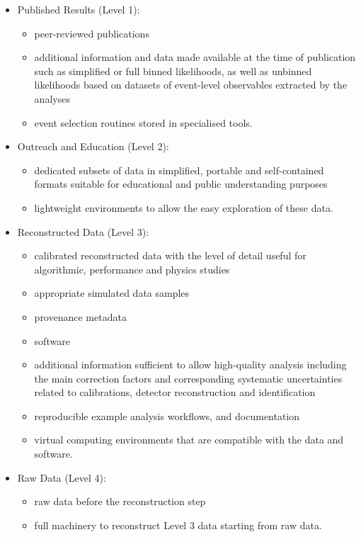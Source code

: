 \documentclass[11pt]{article}
\begin{document}
\begin{itemize}
\item Published Results (Level 1): 
\begin{itemize}
    \item peer-reviewed publications
    \item additional information and data made available at the time of publication such as simplified or full binned likelihoods, as well as unbinned likelihoods based on datasets of event-level observables extracted by the analyses
    \item event selection routines stored in specialised tools.
\end{itemize}
\item Outreach and Education (Level 2): 
\begin{itemize}
    \item dedicated subsets of data in simplified, portable and self-contained formats suitable for educational and public understanding purposes
    \item lightweight environments to allow the easy exploration of these data.
\end{itemize}
\item Reconstructed Data (Level 3): 
\begin{itemize}
    \item calibrated reconstructed data with the level of detail useful for algorithmic, performance and physics studies
    \item appropriate simulated data samples
    \item provenance metadata
    \item software 
    \item additional information sufficient to allow high-quality analysis including the main correction factors and corresponding systematic uncertainties related to calibrations, detector reconstruction and identification
    \item reproducible example analysis workflows, and documentation
    \item virtual computing environments that are compatible with the data and software.
\end{itemize}
\item Raw Data (Level 4): 
\begin{itemize}
    \item raw data before the reconstruction step
    \item full machinery to reconstruct Level 3 data starting from raw data.
\end{itemize}
\end{itemize}
\end{document}
